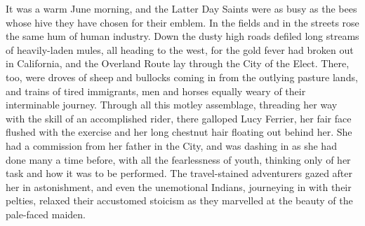 \documentclass[12pt,english,oneside]{book}
\begin{document}
It was a warm June morning, and the Latter Day Saints were as busy
as the bees whose hive they have chosen for their emblem. In the fields
and in the streets rose the same hum of human industry. Down the dusty
high roads defiled long streams of heavily-laden mules, all heading
to the west, for the gold fever had broken out in California, and
the Overland Route lay through the City of the Elect. There, too,
were droves of sheep and bullocks coming in from the outlying pasture
lands, and trains of tired immigrants, men and horses equally weary
of their interminable journey. Through all this motley assemblage,
threading her way with the skill of an accomplished rider, there galloped
Lucy Ferrier, her fair face flushed with the exercise and her long
chestnut hair floating out behind her. She had a commission from her
father in the City, and was dashing in as she had done many a time
before, with all the fearlessness of youth, thinking only of her task
and how it was to be performed. The travel-stained adventurers gazed
after her in astonishment, and even the unemotional Indians, journeying
in with their pelties, relaxed their accustomed stoicism as they marvelled
at the beauty of the pale-faced maiden.
\end{document}

